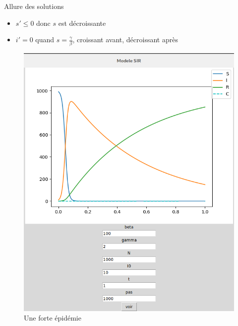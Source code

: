 \documentclass{beamer}
\theoremstyle{plain}
\theoremstyle{definition}
\theoremstyle{remark}
\begin{document}
\begin{frame}{Allure des solutions}
    \begin{itemize}
        \item $s'\leq 0$ donc $s$ est décroissante
        \item $i'=0$ quand $s=\frac{\gamma}{\beta}$, croissant avant, décroissant après 
    \end{itemize}
    \begin{figure}[h]
    \begin{minipage}[c]{.46\linewidth}
        \centering
        \includegraphics{forte_ep.png}
        \caption{Une forte épidémie}
        \end{minipage}
\end{figure}
\end{frame}
\end{document}
